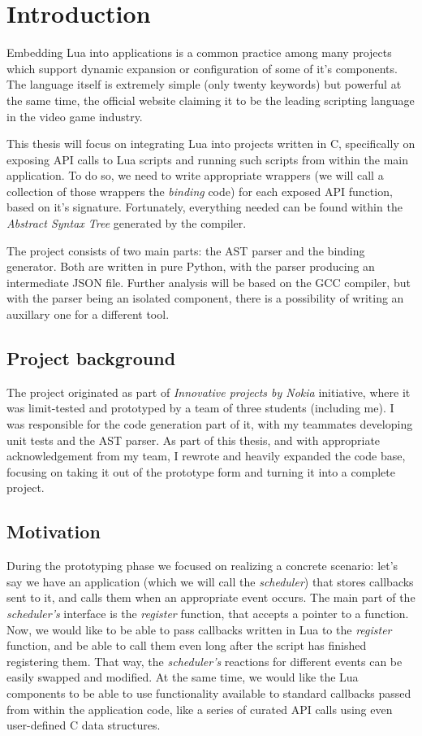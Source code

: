 \documentclass[polish, english]{iithesis}
\author{Mateusz Łuczyński}
\date{\today}
\begin{document}
\chapter{Introduction}
Embedding Lua into applications is a common practice among many projects which support dynamic expansion or configuration of some of it's components.
The language itself is extremely simple (only twenty keywords) but powerful at the same time, the official website claiming it to be the leading scripting language in the video game industry.

This thesis will focus on integrating Lua into projects written in C, specifically on exposing API calls to Lua scripts and running such scripts from within the main application.
To do so, we need to write appropriate wrappers (we will call a collection of those wrappers the \textit{binding} code) for each exposed API function, based on it's signature.
Fortunately, everything needed can be found within the \textit{Abstract Syntax Tree} generated by the compiler. 

The project consists of two main parts: the AST parser and the binding generator.
Both are written in pure Python, with the parser producing an intermediate JSON file.
Further analysis will be based on the GCC compiler, but with the parser being an isolated component, there is a possibility of writing an auxillary one for a different tool.

  \section{Project background}
The project originated as part of \textit{Innovative projects by Nokia} initiative, where it was limit-tested and prototyped by a team of three students (including me).
I was responsible for the code generation part of it, with my teammates developing unit tests and the AST parser. 
As part of this thesis, and with appropriate acknowledgement from my team, I rewrote and heavily expanded the code base, focusing on taking it out of the prototype form and turning it into a complete project.
  \section{Motivation}
During the prototyping phase we focused on realizing a concrete scenario: 
let's say we have an application (which we will call the \textit{scheduler}) that stores callbacks sent to it, and calls them when an appropriate event occurs.
The main part of the \textit{scheduler's} interface is the \textit{register} function, that accepts a pointer to a function.
Now, we would like to be able to pass callbacks written in Lua to the \textit{register} function, and be able to call them even long after the script has finished registering them. 
That way, the \textit{scheduler's} reactions for different events can be easily swapped and modified. 
At the same time, we would like the Lua components to be able to use functionality available to standard callbacks passed from within the application code, like a series of curated API calls using even user-defined C data structures.
\end{document}
